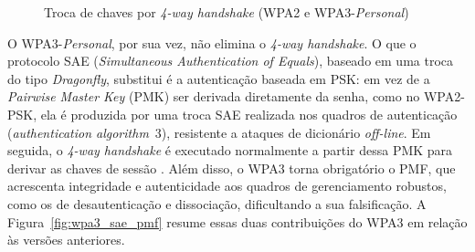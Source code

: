 \begin{figure}[htb]
\centering
\caption{Troca de chaves por \textit{4-way handshake} (WPA2 e WPA3-\textit{Personal})}
\label{fig:handshake_wpa2}
\end{figure}

O WPA3-\textit{Personal}, por sua vez, não elimina o \textit{4-way handshake}. O que o protocolo SAE (\textit{Simultaneous Authentication of Equals}), baseado em uma troca do tipo \textit{Dragonfly}, substitui é a autenticação baseada em PSK: em vez de a \textit{Pairwise Master Key} (PMK) ser derivada diretamente da senha, como no WPA2-PSK, ela é produzida por uma troca SAE realizada nos quadros de autenticação (\textit{authentication algorithm}~3), resistente a ataques de dicionário \textit{off-line}. Em seguida, o \textit{4-way handshake} é executado normalmente a partir dessa PMK para derivar as chaves de sessão \cite{KohliosHayajneh2018,EspressifWifiSecurity}. Além disso, o WPA3 torna obrigatório o PMF, que acrescenta integridade e autenticidade aos quadros de gerenciamento robustos, como os de desautenticação e dissociação, dificultando a sua falsificação. A Figura~\ref{fig:wpa3_sae_pmf} resume essas duas contribuições do WPA3 em relação às versões anteriores.

